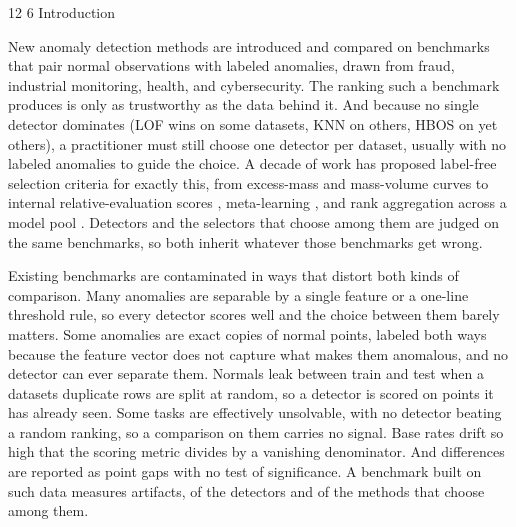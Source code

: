\documentclass[3p,twocolumn]{elsarticle}
\makeatletter
\renewcommand\section{\@startsection{section}{1}{\z@}%
           {12\p@ \@plus 4\p@ \@minus 4\p@}%
           {6\p@ \@plus 4\p@ \@minus 3\p@}%
           {\normalsize\bfseries\boldmath}}
\makeatother
\begin{document}
\begin{frontmatter}
\begin{abstract}
We benchmark every selection method against a demanding reference the selection literature rarely reports: always deploying the single detector with the best average performance. On ADReal this fixed detector is hard to beat. Agreement-based selectors do not beat a random pick once validation sees only normal data; the internal criteria excess-mass and mass-volume are significantly worse than the fixed detector; and a recent injection-based selector comes closest but does not significantly beat it. No popular label-free selection method beats simply deploying one good detector, which is the paper\textquotesingle s central finding. We release ADReal, the complete detector evaluations, the selection-method results, and the associated code.
\end{abstract}

\end{frontmatter}

\section{Introduction}\label{1-introduction}

New anomaly detection methods are introduced and compared on benchmarks that pair normal observations with labeled anomalies, drawn from fraud, industrial monitoring, health, and cybersecurity. The ranking such a benchmark produces is only as trustworthy as the data behind it. And because no single detector dominates (LOF wins on some datasets, KNN on others, HBOS on yet others), a practitioner must still choose one detector per dataset, usually with no labeled anomalies to guide the choice. A decade of work has proposed label-free selection criteria for exactly this, from excess-mass and mass-volume curves \cite{ref1} to internal relative-evaluation scores \cite{ref2}, meta-learning \cite{ref3}, and rank aggregation across a model pool \cite{ref4}. Detectors and the selectors that choose among them are judged on the same benchmarks, so both inherit whatever those benchmarks get wrong.

Existing benchmarks are contaminated in ways that distort both kinds of comparison. Many anomalies are separable by a single feature or a one-line threshold rule, so every detector scores well and the choice between them barely matters. Some anomalies are exact copies of normal points, labeled both ways because the feature vector does not capture what makes them anomalous, and no detector can ever separate them. Normals leak between train and test when a dataset\textquotesingle s duplicate rows are split at random, so a detector is scored on points it has already seen. Some tasks are effectively unsolvable, with no detector beating a random ranking, so a comparison on them carries no signal. Base rates drift so high that the scoring metric divides by a vanishing denominator. And differences are reported as point gaps with no test of significance. A benchmark built on such data measures artifacts, of the detectors and of the methods that choose among them.
\end{document}
